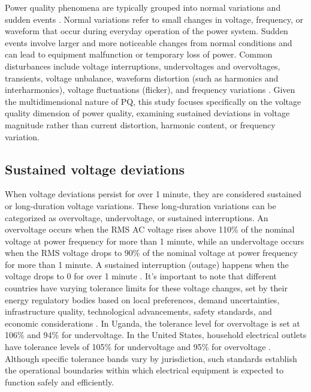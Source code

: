 \documentclass[review]{elsarticle}
\begin{document}
Power quality phenomena are typically grouped into normal variations and sudden events \cite{Bollen2003}. Normal variations refer to small changes in voltage, frequency, or waveform that occur during everyday operation of the power system. Sudden events involve larger and more noticeable changes from normal conditions and can lead to equipment malfunction or temporary loss of power. Common disturbances include voltage interruptions, undervoltages and overvoltages, transients, voltage unbalance, waveform distortion (such as harmonics and interharmonics), voltage fluctuations (flicker), and frequency variations \cite{Dugan2012, Arrillaga2000}. Given the multidimensional nature of PQ, this study focuses specifically on the voltage quality dimension of power quality, examining sustained deviations in voltage magnitude rather than current distortion, harmonic content, or frequency variation.

\subsection{Sustained voltage deviations }
When voltage deviations persist for over 1 minute, they are considered sustained or long-duration voltage variations. These long-duration variations can be categorized as overvoltage, undervoltage, or sustained interruptions. An overvoltage occurs when the RMS AC voltage rises above 110\% of the nominal voltage at power frequency for more than 1 minute, while an undervoltage occurs when the RMS voltage drops to 90\% of the nominal voltage at power frequency for more than 1 minute. A sustained interruption (outage) happens when the voltage drops to 0 for over 1 minute \cite{Caramia2009}. It's important to note that different countries have varying tolerance limits for these voltage changes, set by their energy regulatory bodies based on local preferences, demand uncertainties, infrastructure quality, technological advancements, safety standards, and economic considerations \cite{IEEE1159_2019, ANSI_C84_1_2020, PowerSonicVoltageCountry}. In Uganda, the tolerance level for overvoltage is set at 106\% and 94\% for undervoltage. In the United States, household electrical outlets have tolerance levels of 105\% for undervoltage and 95\% for overvoltage \cite{UgandaGridCode2003, UgandaBuildingCode2019, ANSI_C84_1_2020}. Although specific tolerance bands vary by jurisdiction, such standards establish the operational boundaries within which electrical equipment is expected to function safely and efficiently.
\end{document}
